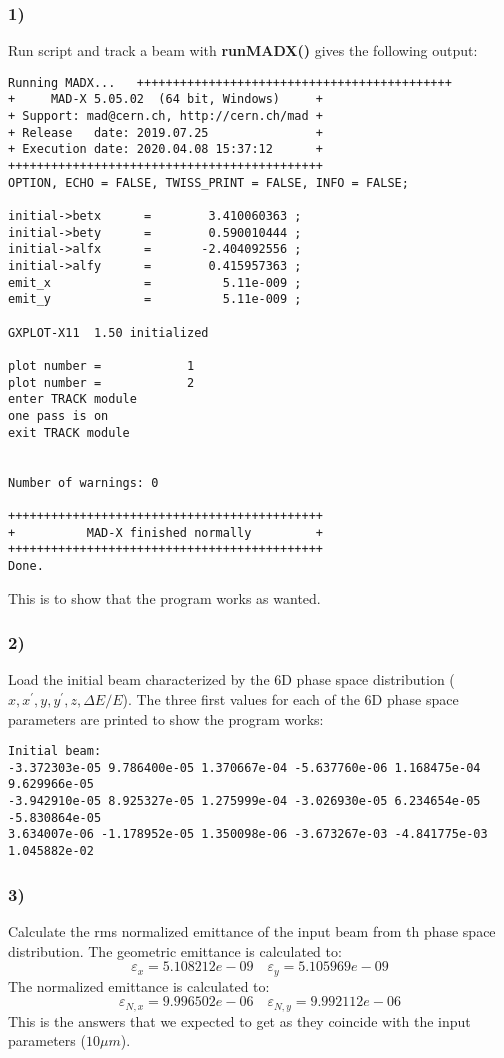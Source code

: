 \documentclass[12pt,a4paper,english]{article}
\begin{document}
\subsubsection*{1)}
Run script and track a beam with \textbf{runMADX()} gives the following output:
\begin{lstlisting}
Running MADX...   ++++++++++++++++++++++++++++++++++++++++++++
+     MAD-X 5.05.02  (64 bit, Windows)     +
+ Support: mad@cern.ch, http://cern.ch/mad +
+ Release   date: 2019.07.25               +
+ Execution date: 2020.04.08 15:37:12      +
++++++++++++++++++++++++++++++++++++++++++++
OPTION, ECHO = FALSE, TWISS_PRINT = FALSE, INFO = FALSE;

initial->betx      =        3.410060363 ;
initial->bety      =        0.590010444 ;
initial->alfx      =       -2.404092556 ;
initial->alfy      =        0.415957363 ;
emit_x             =          5.11e-009 ;
emit_y             =          5.11e-009 ;

GXPLOT-X11  1.50 initialized 

plot number =            1 
plot number =            2 
enter TRACK module
one pass is on
exit TRACK module


Number of warnings: 0

++++++++++++++++++++++++++++++++++++++++++++
+          MAD-X finished normally         +
++++++++++++++++++++++++++++++++++++++++++++
Done.
\end{lstlisting}
This is to show that the program works as wanted.

\subsubsection*{2)}
Load the initial beam characterized by the 6D phase space distribution ($x,x^{\prime},y,y^{\prime}, z, \Delta E/E$). The three first values for each of the 6D phase space parameters are printed to show the program works:
\begin{lstlisting}
Initial beam:
-3.372303e-05 9.786400e-05 1.370667e-04 -5.637760e-06 1.168475e-04 9.629966e-05 
-3.942910e-05 8.925327e-05 1.275999e-04 -3.026930e-05 6.234654e-05 -5.830864e-05 
3.634007e-06 -1.178952e-05 1.350098e-06 -3.673267e-03 -4.841775e-03 1.045882e-02
\end{lstlisting}

\subsubsection*{3)}
Calculate the rms normalized emittance of the input beam from th phase space distribution. The geometric emittance is calculated to: 
\[\varepsilon_x=5.108212e-09\quad \varepsilon_y=5.105969e-09\]
The normalized emittance is calculated to:
\[\varepsilon_{N,x}=9.996502e-06\quad \varepsilon_{N,y}=9.992112e-06\]
This is the answers that we expected to get as they coincide with the input parameters ($10\mu m$).
\end{document}

